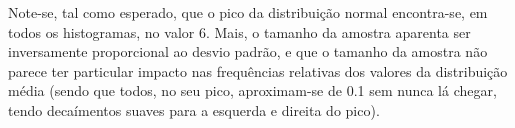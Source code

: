 \documentclass[11pt]{article}
\begin{document}

Note-se, tal como esperado, que o pico da distribuição normal encontra-se, em todos
os histogramas, no valor 6. Mais, o tamanho da amostra aparenta ser inversamente
proporcional ao desvio padrão, e que o tamanho da amostra não parece ter particular
impacto nas frequências relativas dos valores da distribuição média (sendo que todos,
no seu pico, aproximam-se de 0.1 sem nunca lá chegar, tendo decaímentos suaves para a
esquerda e direita do pico).
\end{document}
